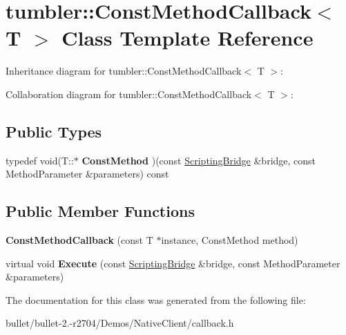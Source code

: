\hypertarget{classtumbler_1_1_const_method_callback}{\section{tumbler\+:\+:Const\+Method\+Callback$<$ T $>$ Class Template Reference}
\label{classtumbler_1_1_const_method_callback}
}


Inheritance diagram for tumbler\+:\+:Const\+Method\+Callback$<$ T $>$\+:


Collaboration diagram for tumbler\+:\+:Const\+Method\+Callback$<$ T $>$\+:
\subsection*{Public Types}
\begin{DoxyCompactItemize}
\item 
\hypertarget{classtumbler_1_1_const_method_callback_afc5d5840397edb1e7582cdfc798542e2}{typedef void(T\+::$\ast$ {\bfseries Const\+Method} )(const \hyperlink{classtumbler_1_1_scripting_bridge}{Scripting\+Bridge} \&bridge, const Method\+Parameter \&parameters) const }\label{classtumbler_1_1_const_method_callback_afc5d5840397edb1e7582cdfc798542e2}

\end{DoxyCompactItemize}
\subsection*{Public Member Functions}
\begin{DoxyCompactItemize}
\item 
\hypertarget{classtumbler_1_1_const_method_callback_ae9dc7841aef4c27dec50161a271fe9e5}{{\bfseries Const\+Method\+Callback} (const T $\ast$instance, Const\+Method method)}\label{classtumbler_1_1_const_method_callback_ae9dc7841aef4c27dec50161a271fe9e5}

\item 
\hypertarget{classtumbler_1_1_const_method_callback_a051db1d27465592dea97006a968d91d8}{virtual void {\bfseries Execute} (const \hyperlink{classtumbler_1_1_scripting_bridge}{Scripting\+Bridge} \&bridge, const Method\+Parameter \&parameters)}\label{classtumbler_1_1_const_method_callback_a051db1d27465592dea97006a968d91d8}

\end{DoxyCompactItemize}


The documentation for this class was generated from the following file\+:\begin{DoxyCompactItemize}
\item 
bullet/bullet-\/2.-\/r2704/\+Demos/\+Native\+Client/callback.\+h\end{DoxyCompactItemize}
